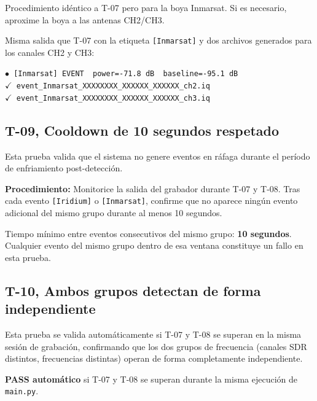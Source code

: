 Procedimiento idéntico a T-07 pero para la boya Inmarsat. Si es necesario, aproxime la boya a las antenas CH2/CH3.

\begin{tcolorbox}[colback=gray!5, colframe=deyposcolor, title=Resultado esperado (T-08)]
Misma salida que T-07 con la etiqueta \texttt{[Inmarsat]} y dos archivos generados para los canales CH2 y CH3:
\vspace{0.2cm}
\begin{center}
    \texttt{\textcolor{orange!80!black}{$\bullet$} [Inmarsat] EVENT \ power=-71.8 dB \ baseline=-95.1 dB} \\
    \texttt{\quad \textcolor{green!60!black}{$\checkmark$} event\_Inmarsat\_XXXXXXXX\_XXXXXX\_XXXXXX\_ch2.iq} \\
    \texttt{\quad \textcolor{green!60!black}{$\checkmark$} event\_Inmarsat\_XXXXXXXX\_XXXXXX\_XXXXXX\_ch3.iq}
\end{center}
\end{tcolorbox}

\subsection{T-09, Cooldown de 10 segundos respetado}

Esta prueba valida que el sistema no genere eventos en ráfaga durante el período de enfriamiento post-detección.

\textbf{Procedimiento:} Monitorice la salida del grabador durante T-07 y T-08. Tras cada evento \texttt{[Iridium]} o \texttt{[Inmarsat]}, confirme que no aparece ningún evento adicional del mismo grupo durante al menos 10 segundos.

\begin{tcolorbox}[colback=gray!5, colframe=deyposcolor, title=Resultado esperado (T-09)]
Tiempo mínimo entre eventos consecutivos del mismo grupo: \textbf{10 segundos}. Cualquier evento del mismo grupo dentro de esa ventana constituye un fallo en esta prueba.
\end{tcolorbox}

\subsection{T-10, Ambos grupos detectan de forma independiente}

Esta prueba se valida automáticamente si T-07 y T-08 se superan en la misma sesión de grabación, confirmando que los dos grupos de frecuencia (canales SDR distintos, frecuencias distintas) operan de forma completamente independiente.

\begin{tcolorbox}[colback=gray!5, colframe=deyposcolor, title=Resultado esperado (T-10)]
\textbf{PASS automático} si T-07 y T-08 se superan durante la misma ejecución de \texttt{main.py}.
\end{tcolorbox}